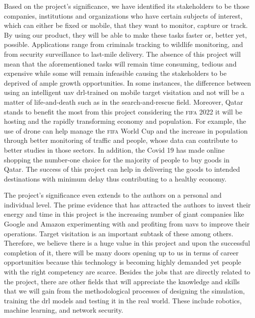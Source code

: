 \documentclass[../main.tex]{subfiles}
\begin{document}
Based on the project's significance, we have identified 
its stakeholders to be 
those companies, institutions and organizations who
have certain subjects of interest, 
which can either be fixed or mobile,
that they want to monitor, capture or track.
By using our product,
they will be able to make these tasks faster or,
better yet, possible.
Applications range from criminals tracking 
to wildlife monitoring,
and from security surveillance
to last-mile delivery.
The absence of this project will mean that
the aforementioned tasks will remain
time consuming, tedious and expensive
while some will remain infeasible
causing the stakeholders to be deprived of ample growth opportunities.
In some instances, the difference between using 
an intelligent \gls{uav} \gls{drl}-trained on mobile target visitation
and not
will be a matter of life-and-death
such as in the search-and-rescue field.
Moreover, Qatar stands to benefit the most from this project 
considering the \textsc{fifa} 2022 it will be hosting
and the rapidly transforming economy and population.
For example, the use of drone can help manage 
the \textsc{fifa} World Cup 
and the increase in population through better monitoring 
of traffic and people, whose data can contribute
to better studies in those sectors.
In addition, the Covid 19 has made online shopping
the number-one choice for the majority of people to buy goods in Qatar.
The success of this project can help in delivering
the goods to intended destinations with minimum delay
thus contributing to a healthy economy.

The project's significance even extends to the authors
on a personal and individual level.
The prime evidence that has attracted the authors to invest
their energy and time in this project is
the increasing number of giant companies like Google and Amazon
experimenting with and profiting from \glspl{uav}
to improve their operations.
Target visitation is an important subtask of these among others.
Therefore, we believe there is a huge value
in this project and upon the successful completion of it,
there will be many doors opening up to us in terms of
career opportunities because 
this technology is becoming highly demanded yet 
people with the right competency
are scarce.
Besides the jobs that are directly related to the project,
there are other fields that will appreciate the knowledge
and skills that we will gain from the methodological processes 
of designing the simulation,
training the \gls{drl} models and testing it in the real world.
These include robotics, machine learning, and 
network security.
\end{document}
